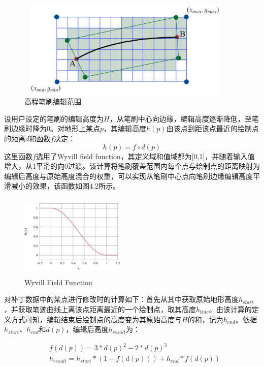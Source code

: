 \begin{figure}[ht]
    \centering
    \includegraphics[height=4.7cm ,width=10.45cm]{figures/editArea.jpg}
  \caption{高程笔刷编辑范围}
  \end{figure}
设用户设定的笔刷的编辑高度为$H$，从笔刷中心向边缘，编辑高度逐渐降低，至笔刷边缘时降为0。对地形上某点$p$，其编辑高度$h(p)$由该点到距该点最近的绘制点的距离$d$和函数$f$决定：
\begin{equation}
h(p) = f \circ d(p)
\end{equation}
这里函数$f$选用了Wyvill field function\supercite{wyvill}，其定义域和值域都为[0,1]，并随着输入值增大，从1平滑的向0过渡。该计算将笔刷覆盖范围内每个点与绘制点的距离映射为编辑后高度与原始高度混合的权重，可以实现从笔刷中心点向笔刷边缘编辑高度平滑减小的效果，该函数如图4.2所示。\par
\begin{figure}[ht]
\centering
\includegraphics[height=4cm        ,width=5cm]{figures/Wyvill-field-function.jpg}
\caption{Wyvill Field Function\supercite{wyvill}}
\end{figure}
对补丁数据中的某点进行修改时的计算如下：首先从其中获取原始地形高度$h_{start}$，并获取笔迹曲线上离该点距离最近的一个绘制点，取其高度$h_{line}$。由该计算的定义方式可知，编辑结束后绘制点的高度变为其原始高度与$H$的和，记为$h_{end}$。依据$h_{start}$、$h_{end}$和$d(p)$，编辑后高度$h_{result}$为：\par
\begin{equation}
\begin{aligned}
& f(d(p)) = 3 * d(p)^2 - 2 * d(p)^3\\
&h_{result}=h_{start} * (1 - f(d(p))) + h_{end} * f(d(p))
\end{aligned}
\end{equation}
